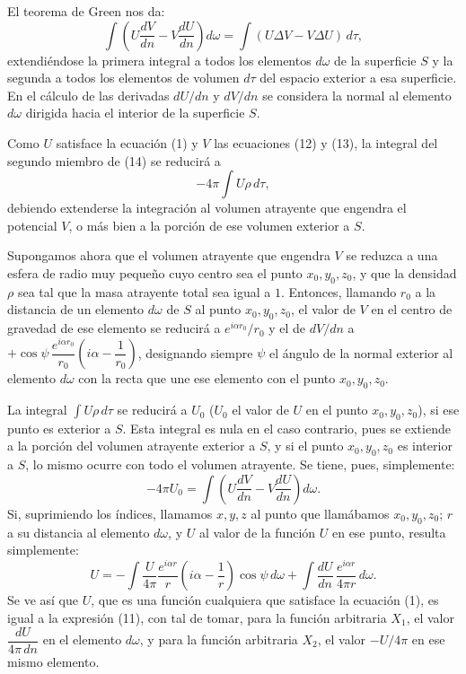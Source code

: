 El teorema de Green nos da:
\begin{equation}
\int\left(U\frac{dV}{dn}-V\frac{dU}{dn}\right)d\omega =
\int(U\Delta V-V\Delta U)\,d\tau,
\tag{14}
\end{equation}
extendiéndose la primera integral a todos los elementos $d\omega$ de la
superficie $S$ y la segunda a todos los elementos de volumen $d\tau$ del
espacio exterior a esa superficie. En el cálculo de las derivadas
$dU/dn$ y $dV/dn$ se considera la normal al elemento $d\omega$ dirigida
hacia el interior de la superficie $S$.

Como $U$ satisface la ecuación (1) y $V$ las ecuaciones (12) y (13), la
integral del segundo miembro de (14) se reducirá a
\[
-4\pi\int U\rho\,d\tau,
\]
debiendo extenderse la integración al volumen atrayente que engendra el
potencial $V$, o más bien a la porción de ese volumen exterior a $S$.

Supongamos ahora que el volumen atrayente que engendra $V$ se reduzca a
una esfera de radio muy pequeño cuyo centro sea el punto $x_0,y_0,z_0$, y
que la densidad $\rho$ sea tal que la masa atrayente total sea igual a
$1$. Entonces, llamando $r_0$ a la distancia de un elemento $d\omega$ de
$S$ al punto $x_0,y_0,z_0$, el valor de $V$ en el centro de gravedad de
ese elemento se reducirá a $e^{i\alpha r_0}/r_0$ y el de $dV/dn$ a
$+\cos\psi\,\dfrac{e^{i\alpha r_0}}{r_0}\left(i\alpha-\dfrac{1}{r_0}\right)$,
designando siempre $\psi$ el ángulo de la normal exterior al elemento
$d\omega$ con la recta que une ese elemento con el punto $x_0,y_0,z_0$.

La integral $\int U\rho\,d\tau$ se reducirá a $U_0$ ($U_0$ el valor de $U$
en el punto $x_0,y_0,z_0$), si ese punto es exterior a $S$. Esta integral
es nula en el caso contrario, pues se extiende a la porción del volumen
atrayente exterior a $S$, y si el punto $x_0,y_0,z_0$ es interior a $S$,
lo mismo ocurre con todo el volumen atrayente. Se tiene, pues, simplemente:
\[
-4\pi U_0 = \int\left(U\frac{dV}{dn}-V\frac{dU}{dn}\right)d\omega.
\]
Si, suprimiendo los índices, llamamos $x,y,z$ al punto que llamábamos
$x_0,y_0,z_0$; $r$ a su distancia al elemento $d\omega$, y $U$ al valor de
la función $U$ en ese punto, resulta simplemente:
\begin{equation}
U = -\int \frac{U}{4\pi}\frac{e^{i\alpha r}}{r}\left(i\alpha-\frac1r\right)
\cos\psi\,d\omega + \int \frac{dU}{dn}\,\frac{e^{i\alpha r}}{4\pi r}\,d\omega.
\tag{15}
\end{equation}
Se ve así que $U$, que es una función cualquiera que satisface la
ecuación (1), es igual a la expresión (11), con tal de tomar, para la
función arbitraria $X_1$, el valor $\dfrac{dU}{4\pi\,dn}$ en el elemento
$d\omega$, y para la función arbitraria $X_2$, el valor $-U/4\pi$ en ese
mismo elemento.

